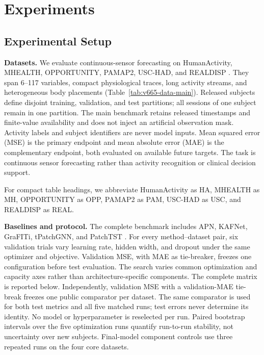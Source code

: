 \section{Experiments}

\subsection{Experimental Setup}

\textbf{Datasets.}
We evaluate continuous-sensor forecasting on HumanActivity, MHEALTH,
OPPORTUNITY, PAMAP2, USC-HAD, and REALDISP
\citep{rubanova2019latent,uci_mhealth,uci_opportunity,uci_pamap2,usc_had,uci_realdisp}. They span
6--117 variables, compact physiological traces, long activity streams, and
heterogeneous body placements (Table~\ref{tab:v665-data-main}). Released
subjects define disjoint training, validation, and test partitions; all
sessions of one subject remain in one partition. The main benchmark retains
released timestamps and finite-value availability and does not inject an
artificial observation mask. Activity labels and subject identifiers are never
model inputs. Mean squared error (MSE) is the primary endpoint and mean
absolute error (MAE) is the complementary endpoint, both evaluated on
available future targets. The task
is continuous sensor forecasting rather than activity recognition or clinical
decision support.



For compact table headings, we abbreviate HumanActivity as HA, MHEALTH as MH,
OPPORTUNITY as OPP, PAMAP2 as PAM, USC-HAD as USC, and REALDISP as REAL.

\textbf{Baselines and protocol.}
The complete benchmark includes APN, KAFNet, GraFITi, tPatchGNN, and PatchTST
\citep{apn2026,kafnet2026,grafiti2024,tpatchgnn2024,nie2023patchtst}. For every
method--dataset pair, six validation trials vary learning rate, hidden width,
and dropout under the same optimizer and objective. Validation MSE, with
MAE as tie-breaker, freezes one configuration before test evaluation. The
search varies common optimization and capacity axes rather than
architecture-specific components. The
complete matrix is reported below. Independently, validation MSE with a
validation-MAE tie-break freezes one public comparator per dataset. The same
comparator is used for both test metrics and all five matched runs; test errors
never determine its identity. No model or hyperparameter is reselected per
run. Paired bootstrap intervals over the five optimization runs quantify
run-to-run stability, not uncertainty over new subjects. Final-model component controls use three
repeated runs on the four core datasets.

